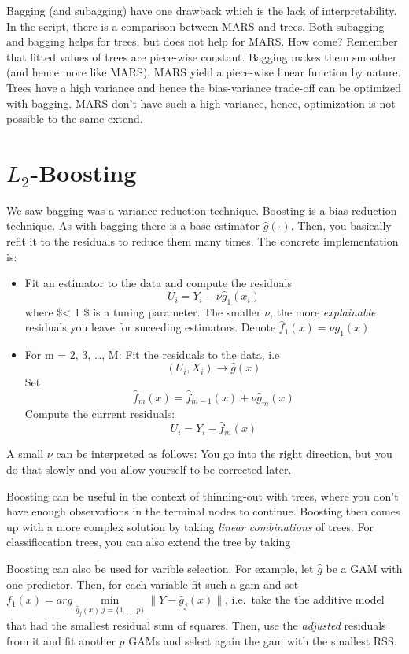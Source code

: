 \documentclass[]{book}
\begin{document}
Bagging (and subagging) have one drawback which is the lack of
interpretability. In the script, there is a comparison between MARS and
trees. Both subagging and bagging helps for trees, but does not help for
MARS. How come? Remember that fitted values of trees are piece-wise
constant. Bagging makes them smoother (and hence more like MARS). MARS
yield a piece-wise linear function by nature. Trees have a high variance
and hence the bias-variance trade-off can be optimized with bagging.
MARS don't have such a high variance, hence, optimization is not
possible to the same extend.

\section{\texorpdfstring{\(L_2\)-Boosting}{L\_2-Boosting}}\label{l_2-boosting}

We saw bagging was a variance reduction technique. Boosting is a bias
reduction technique. As with bagging there is a base estimator
\(\hat{g}(\cdot)\). Then, you basically refit it to the residuals to
reduce them many times. The concrete implementation is:

\begin{itemize}
\item
  Fit an estimator to the data and compute the residuals
  \[U_i = Y_i - \nu\hat{g}_1(x_i)\] where \$\nu \textless{} 1 \$ is a
  tuning parameter. The smaller \(\nu\), the more \emph{explainable}
  residuals you leave for suceeding estimators. Denote
  \(\hat{f}_1(x) = \nu g_1(x)\)
\item
  For m = 2, 3, \ldots{}, M: Fit the residuals to the data, i.e
  \[ (U_i, X_i) \rightarrow \hat{g}(x)\] Set
  \[ \hat{f}_m(x) = \hat{f}_{m-1}(x) + \nu \hat{g}_m(x)\] Compute the
  current residuals: \[U_i = Y_i - \hat{f}_m(x)\]
\end{itemize}

A small \(\nu\) can be interpreted as follows: You go into the right
direction, but you do that slowly and you allow yourself to be corrected
later.

Boosting can be useful in the context of thinning-out with trees, where
you don't have enough observations in the terminal nodes to continue.
Boosting then comes up with a more complex solution by taking
\emph{linear combinations} of trees. For classificcation trees, you can
also extend the tree by taking

Boosting can also be used for varible selection. For example, let
\(\hat{g}\) be a GAM with one predictor. Then, for each variable fit
such a gam and set
\(f_1(x) = arg\min\limits_{\hat{g}_j(x) \; j =\{1, ..., p\}}\|Y - \hat{g}_j(x)\|\),
i.e.~take the the additive model that had the smallest residual sum of
squares. Then, use the \emph{adjusted} residuals from it and fit another
\(p\) GAMs and select again the gam with the smallest RSS.
\end{document}
